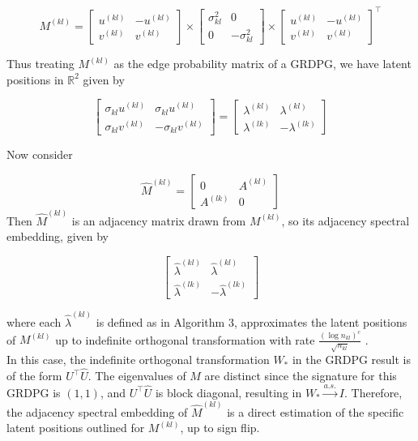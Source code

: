 \documentclass[12pt]{article}
\begin{document}
\[M^{(kl)} =
\begin{bmatrix} u^{(kl)} & -u^{(kl)} \\ v^{(kl)} & v^{(kl)} \end{bmatrix} \times
\begin{bmatrix} \sigma^2_{kl} & 0 \\ 0 & -\sigma^2_{kl} \end{bmatrix} \times
\begin{bmatrix} u^{(kl)} & -u^{(kl)} \\ v^{(kl)} & v^{(kl)} \end{bmatrix}^\top\]

Thus treating \(M^{(kl)}\) as the edge probability matrix of a GRDPG, we
have latent positions in \(\mathbb{R}^2\) given by

\[\begin{bmatrix}
  \sigma_{kl} u^{(kl)} & \sigma_{kl} u^{(kl)} \\
  \sigma_{kl} v^{(kl)} & -\sigma_{kl} v^{(kl)}
\end{bmatrix} =
\begin{bmatrix}
  \lambda^{(kl)} & \lambda^{(kl)} \\
  \lambda^{(lk)} & -\lambda^{(lk)}
\end{bmatrix}\]

Now consider

\[\hat{M}^{(kl)} = \begin{bmatrix} 0 & A^{(kl)} \\ A^{(lk)} & 0 \end{bmatrix}\]
Then \(\hat{M}^{(kl)}\) is an adjacency matrix drawn from \(M^{(kl)}\),
so its adjacency spectral embedding, given by

\[\begin{bmatrix}
  \hat{\lambda}^{(kl)} & \hat{\lambda}^{(kl)} \\
  \hat{\lambda}^{(lk)} & -\hat{\lambda}^{(lk)}
\end{bmatrix}\]

where each \(\hat{\lambda}^{(kl)}\) is defined as in Algorithm 3,
approximates the latent positions of \(M^{(kl)}\) up to indefinite
orthogonal transformation with rate $\frac{(\log n_{kl})^c}{\sqrt{n_{kl}}}$
\cite{rubindelanchy2017statistical}.\\
In this case, the indefinite orthogonal transformation \(W_*\) in the
GRDPG result \cite{rubindelanchy2017statistical} is of the form
\(U^\top \hat{U}\). The eigenvalues of \(M\) are distinct since the
signature for this GRDPG is \((1, 1)\), and \(U^\top \hat{U}\) is block
diagonal, resulting in \(W_* \stackrel{a.s.}{\to} I\). Therefore, the
adjacency spectral embedding of \(\hat{M}^{(kl)}\) is a direct
estimation of the specific latent positions outlined for \(M^{(kl)}\),
up to sign flip.

\renewcommand\refname{References}
  
\end{document}
